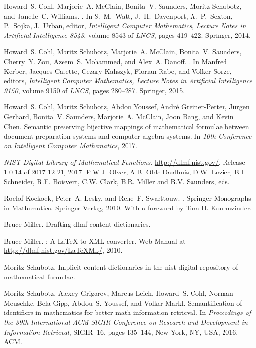 \documentclass[]{article}
\begin{document}
    \undefinedLaTeXCommand


    \begin{thebibliography}{1}

Howard~S. Cohl, Marjorie~A. McClain, Bonita~V. Saunders, Moritz Schubotz, and
  Janelle~C. Williams.
.
\newblock In {S.~M.~Watt, J.~H.~Davenport, A.~P.~Sexton, P.~Sojka, J.~Urban},
  editor, {\em Intelligent Computer Mathematics, Lecture Notes in Artificial
  Intelligence 8543}, volume 8543 of {\em LNCS}, pages 419--422. Springer,
  2014.

Howard~S. Cohl, Moritz Schubotz, Marjorie~A. McClain, Bonita~V. Saunders,
  Cherry~Y. Zou, Azeem~S. Mohammed, and Alex~A. Danoff.
.
\newblock In Manfred Kerber, Jacques Carette, Cezary Kaliszyk, Florian Rabe,
  and Volker Sorge, editors, {\em Intelligent Computer Mathematics, Lecture
  Notes in Artificial Intelligence 9150}, volume 9150 of {\em LNCS}, pages
  280--287. Springer, 2015.

Howard~S. Cohl, Moritz Schubotz, Abdou Youssef, Andr\'{e} Greiner-Petter,
  J\"urgen Gerhard, Bonita~V. Saunders, Marjorie~A. McClain, Joon Bang, and
  Kevin Chen.
\newblock Semantic preserving bijective mappings of mathematical formulae
  between document preparation systems and computer algebra systems.
\newblock In {\em 10th Conference on Intelligent Computer Mathematics}, 2017.

    {\it NIST Digital Library of Mathematical Functions}.
\newblock \url{http://dlmf.nist.gov/}, Release 1.0.14 of 2017-12-21, 2017.
\newblock F.W.J. Olver, A.B. {Olde Daalhuis}, D.W. Lozier, B.I. Schneider, R.F.
  Boisvert, C.W. Clark, B.R. Miller and B.V. Saunders, eds.

Roelof Koekoek, Peter~A. Lesky, and Rene~F. Swarttouw.
.
\newblock Springer Monographs in Mathematics. Springer-Verlag, 2010.
\newblock With a foreword by Tom H. Koornwinder.

Bruce Miller.
\newblock Drafting dlmf content dictionaries.

Bruce Miller.
: A {\LaTeX} to {XML} converter.
\newblock Web Manual at \url{http://dlmf.nist.gov/LaTeXML/}, 2010.

Moritz Schubotz.
\newblock Implicit content dictionaries in the nist digital repository of
  mathematical formulae.

Moritz Schubotz, Alexey Grigorev, Marcus Leich, Howard~S. Cohl, Norman
  Meuschke, Bela Gipp, Abdou~S. Youssef, and Volker Markl.
\newblock Semantification of identifiers in mathematics for better math
  information retrieval.
\newblock In {\em Proceedings of the 39th International ACM SIGIR Conference on
  Research and Development in Information Retrieval}, SIGIR '16, pages
  135--144, New York, NY, USA, 2016. ACM.

\end{thebibliography}
\end{document}
